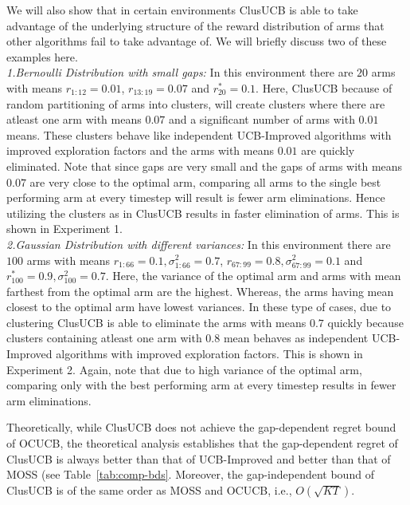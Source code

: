 We will also show that in certain environments ClusUCB is able to take advantage of the underlying structure of the reward distribution of arms that other algorithms fail to take advantage of. We will briefly discuss two of these examples here.
\\
\textit{1.Bernoulli Distribution with small gaps:} In this environment there are $20$ arms with means $r_{1:12}=0.01$, $r_{13:19}=0.07$ and $r_{20}^{*} =0.1$. Here, ClusUCB because of random partitioning of arms into clusters, will create clusters where there are atleast one arm with means $0.07$ and a significant number of arms with $0.01$ means. These clusters behave like independent UCB-Improved algorithms with improved exploration factors and the arms with means $0.01$ are quickly eliminated. Note that since gaps are very small and the gaps of arms with means $0.07$ are very close to the optimal arm, comparing all arms to the single best performing arm at every timestep will result is fewer arm eliminations. Hence utilizing the clusters as in ClusUCB results in faster elimination of arms. This is shown in Experiment 1.\\
\textit{2.Gaussian Distribution with different variances:} In this environment there are $100$ arms with means $r_{1:66}=0.1,\sigma_{1:66}^2 =0.7$, $r_{67:99}=0.8,\sigma_{67:99}^2 =0.1$ and $r_{100}^{*}=0.9, \sigma_{100}^2 =0.7$. Here, the variance of the optimal arm and arms with mean farthest from  the optimal arm are the highest. Whereas, the arms having mean closest to the optimal arm have lowest variances. In these type of cases, due to clustering ClusUCB is able to eliminate the arms with means $0.7$ quickly because clusters containing atleast one arm with $0.8$ mean behaves as independent UCB-Improved algorithms with improved exploration factors. This is shown in Experiment 2. Again, note that due to high variance of the optimal arm, comparing only with the best performing arm at every timestep results in fewer arm eliminations.

Theoretically, while ClusUCB does not achieve the gap-dependent regret bound of OCUCB, the theoretical analysis establishes that the gap-dependent regret of ClusUCB is always better than that of UCB-Improved and better than that of MOSS (see Table~\ref{tab:comp-bds}. Moreover, the gap-independent bound of ClusUCB is of the same order as MOSS and OCUCB, i.e., $O\left(\sqrt{KT}\right)$. 



